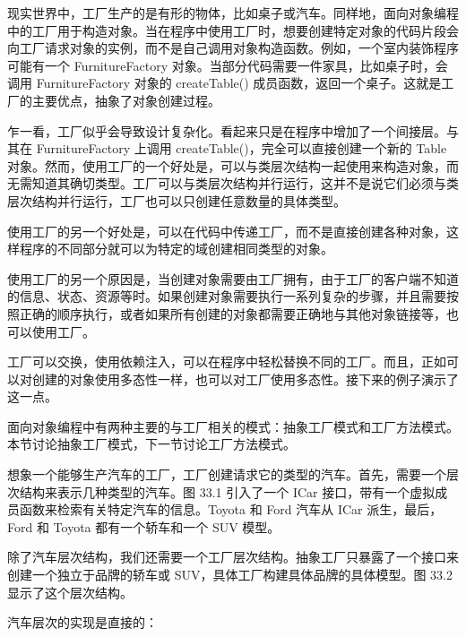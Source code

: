 
现实世界中，工厂生产的是有形的物体，比如桌子或汽车。同样地，面向对象编程中的工厂用于构造对象。当在程序中使用工厂时，想要创建特定对象的代码片段会向工厂请求对象的实例，而不是自己调用对象构造函数。例如，一个室内装饰程序可能有一个 FurnitureFactory 对象。当部分代码需要一件家具，比如桌子时，会调用 FurnitureFactory 对象的 createTable() 成员函数，返回一个桌子。这就是工厂的主要优点，抽象了对象创建过程。

乍一看，工厂似乎会导致设计复杂化。看起来只是在程序中增加了一个间接层。与其在 FurnitureFactory 上调用 createTable()，完全可以直接创建一个新的 Table 对象。然而，使用工厂的一个好处是，可以与类层次结构一起使用来构造对象，而无需知道其确切类型。工厂可以与类层次结构并行运行，这并不是说它们必须与类层次结构并行运行，工厂也可以只创建任意数量的具体类型。

使用工厂的另一个好处是，可以在代码中传递工厂，而不是直接创建各种对象，这样程序的不同部分就可以为特定的域创建相同类型的对象。

使用工厂的另一个原因是，当创建对象需要由工厂拥有，由于工厂的客户端不知道的信息、状态、资源等时。如果创建对象需要执行一系列复杂的步骤，并且需要按照正确的顺序执行，或者如果所有创建的对象都需要正确地与其他对象链接等，也可以使用工厂。

工厂可以交换，使用依赖注入，可以在程序中轻松替换不同的工厂。而且，正如可以对创建的对象使用多态性一样，也可以对工厂使用多态性。接下来的例子演示了这一点。

面向对象编程中有两种主要的与工厂相关的模式：抽象工厂模式和工厂方法模式。本节讨论抽象工厂模式，下一节讨论工厂方法模式。


想象一个能够生产汽车的工厂，工厂创建请求它的类型的汽车。首先，需要一个层次结构来表示几种类型的汽车。图 33.1 引入了一个 ICar 接口，带有一个虚拟成员函数来检索有关特定汽车的信息。Toyota 和 Ford 汽车从 ICar 派生，最后，Ford 和 Toyota 都有一个轿车和一个 SUV 模型。


除了汽车层次结构，我们还需要一个工厂层次结构。抽象工厂只暴露了一个接口来创建一个独立于品牌的轿车或 SUV，具体工厂构建具体品牌的具体模型。图 33.2 显示了这个层次结构。



汽车层次的实现是直接的：

